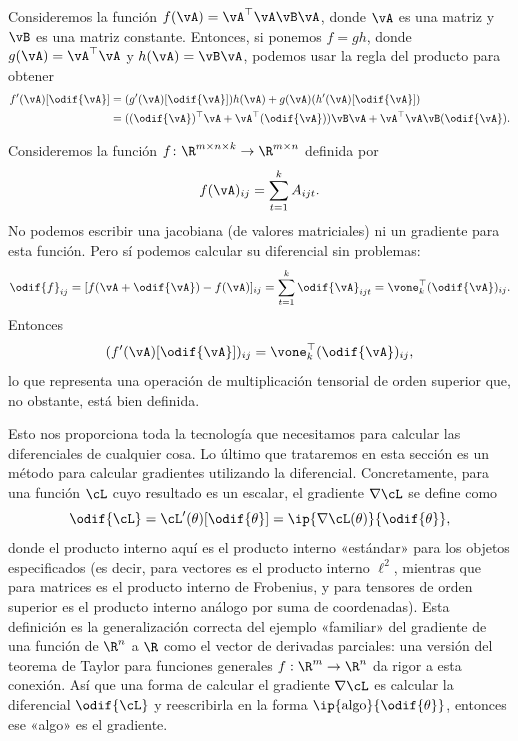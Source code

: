 \documentclass[../../book-main_es.tex]{subfiles}
\begin{document}
\begin{example}
    Consideremos la función \(f(\vA) = \vA^{\top}\vA\vB\vA\), donde
    \(\vA\) es una matriz y \(\vB\) es una matriz constante. Entonces,
    si ponemos \(f = gh\), donde \(g(\vA) = \vA^{\top}\vA\) y \(h(\vA)
    = \vB\vA\), podemos usar la regla del producto para obtener
    \begin{align}
        f^{\prime}(\vA)[\odif{\vA}]
        &= (g^{\prime}(\vA)[\odif{\vA}])h(\vA) +
        g(\vA)(h^{\prime}(\vA)[\odif{\vA}]) \\
        &= ((\odif{\vA})^{\top}\vA + \vA^{\top}(\odif{\vA}))\vB\vA +
        \vA^{\top}\vA\vB(\odif{\vA}).
    \end{align}
\end{example}

\begin{example}
    Consideremos la función \(f \colon \R^{m \times n \times k} \to
    \R^{m \times n}\) definida por
    \begin{equation}
        f(\vA)_{ij} = \sum_{t = 1}^{k}A_{ijt}.
    \end{equation}
    No podemos escribir una jacobiana (de valores matriciales) ni un gradiente para esta
    función. Pero sí podemos calcular su diferencial sin problemas:
    \begin{equation}
        \odif{f}_{ij} = [f(\vA + \odif{\vA}) - f(\vA)]_{ij} = \sum_{t
        = 1}^{k}\odif{\vA}_{ijt} = \vone_{k}^{\top}(\odif{\vA})_{ij}.
    \end{equation}
    Entonces
    \begin{equation}
        (f^{\prime}(\vA)[\odif{\vA}])_{ij} = \vone_{k}^{\top}(\odif{\vA})_{ij},
    \end{equation}
    lo que representa una operación de multiplicación tensorial de orden superior
    que, no obstante, está bien definida.
\end{example}

Esto nos proporciona toda la tecnología que necesitamos para calcular las diferenciales de cualquier cosa.
Lo último que trataremos en esta sección es un método para calcular gradientes utilizando
la diferencial. Concretamente, para una función \(\cL\) cuyo resultado es un escalar, el
gradiente \(\nabla \cL\) se define como
\begin{equation}
    \odif{\cL} = \cL^{\prime}(\theta)[\odif{\theta}] = \ip{\nabla
    \cL(\theta)}{\odif{\theta}},
\end{equation}
donde el producto interno aquí es el producto interno «estándar» para
los objetos especificados (es decir, para vectores es el producto interno \(\ell^{2}\),
    mientras que para matrices es el producto interno de Frobenius, y
para tensores de orden superior es el producto interno análogo por suma de coordenadas).
Esta definición es la generalización correcta del ejemplo «familiar» del
gradiente de una función de $\R^n$ a $\R$ como el vector de derivadas parciales:
una versión del teorema de Taylor para funciones generales $f : \R^m \to
\R^n$ da rigor a esta conexión.
Así que una forma de calcular el gradiente \(\nabla \cL\) es calcular la diferencial
\(\odif{\cL}\) y reescribirla en la forma
\(\ip{\text{algo}}{\odif{\theta}}\), entonces ese «algo» es el
gradiente.
\end{document}
